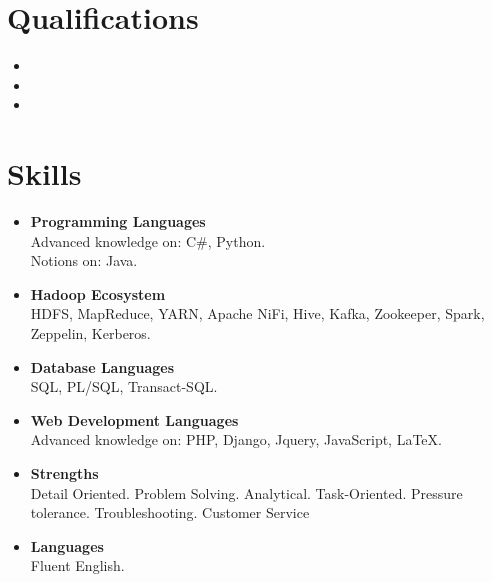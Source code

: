 \documentclass[11pt,a4paper,roman]{moderncv}        %
\begin{document}
\section{Qualifications}

\vspace{3pt}

\begin{itemize}
\item{}
\item{}
\item{}
\end{itemize}

\section{Skills}
\begin{itemize}
\item \textbf{Programming Languages} \\Advanced knowledge on: C\#, Python. \\Notions on: Java.
\vspace{3pt}
\item \textbf{Hadoop Ecosystem}\\HDFS, MapReduce, YARN, Apache NiFi, Hive, Kafka, Zookeeper, Spark, Zeppelin, Kerberos.
\vspace{3pt}
\item \textbf{Database Languages} \\SQL, PL/SQL, Transact-SQL.
\vspace{3pt}
\item \textbf{Web Development Languages} \\Advanced knowledge on: PHP, Django, Jquery, JavaScript, \LaTeX.
\vspace{3pt}
\item \textbf{Strengths} \\Detail Oriented. Problem Solving. Analytical. Task-Oriented. Pressure tolerance. Troubleshooting. Customer Service
\vspace{3pt}
\item \textbf{Languages} \\Fluent English.
\end{itemize}
\nocite{*}
\end{document}
